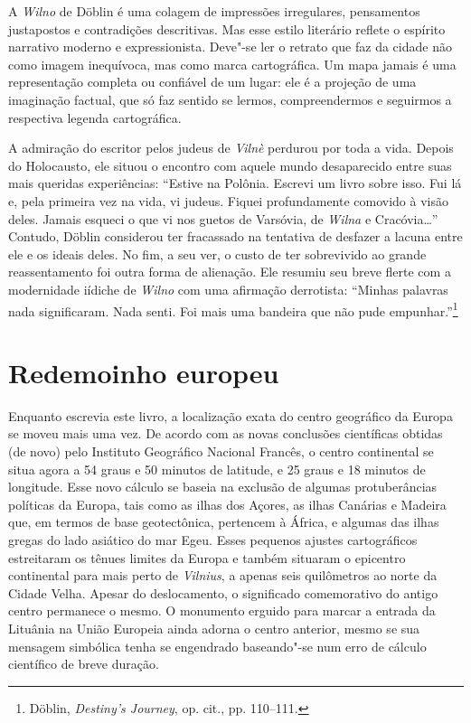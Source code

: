 A \textit{Wilno} de Döblin é uma colagem de impressões irregulares, pensamentos
justapostos e contradições descritivas. Mas esse estilo literário
reflete o espírito narrativo moderno e expressionista. Deve"-se ler o
retrato que faz da cidade não como imagem inequívoca, mas como marca
cartográfica. Um mapa jamais é uma representação completa ou confiável
de um lugar: ele é a projeção de uma imaginação factual, que só faz
sentido se lermos, compreendermos e seguirmos a respectiva legenda
cartográfica.

A admiração do escritor pelos judeus de \textit{Vilnè} perdurou por toda a vida.
Depois do Holocausto, ele situou o encontro com aquele mundo
desaparecido entre suas mais queridas experiências: ``Estive na Polônia.
Escrevi um livro sobre isso. Fui lá e, pela primeira vez na vida, vi
judeus. Fiquei profundamente comovido à visão deles. Jamais esqueci o
que vi nos guetos de Varsóvia, de \textit{Wilna} e Cracóvia\ldots{}'' Contudo,
Döblin considerou ter fracassado na tentativa de desfazer a lacuna entre
ele e os ideais deles. No fim, a seu ver, o custo de ter sobrevivido ao
grande reassentamento foi outra forma de alienação. Ele resumiu seu
breve flerte com a modernidade iídiche de \textit{Wilno} com uma afirmação
derrotista: ``Minhas palavras nada significaram. Nada senti. Foi mais
uma bandeira que não pude empunhar.''\footnote{Döblin, \textit{Destiny's Journey}, op. cit., pp. 110--111.}

\chapter[Redemoinho europeu \medskip]{Redemoinho europeu}

\begin{epigraphs} 
\end{epigraphs}

Enquanto escrevia este livro, a localização exata do centro geográfico
da Europa se moveu mais uma vez. De acordo com as novas conclusões
científicas obtidas (de novo) pelo Instituto Geográfico Nacional
Francês, o centro continental se situa agora a 54 graus e 50 minutos de
latitude, e 25 graus e 18 minutos de longitude. Esse novo cálculo se
baseia na exclusão de algumas protuberâncias políticas da Europa, tais
como as ilhas dos Açores, as ilhas Canárias e Madeira que, em termos de
base geotectônica, pertencem à África, e algumas das ilhas gregas do
lado asiático do mar Egeu. Esses pequenos ajustes cartográficos
estreitaram os tênues limites da Europa e também situaram o epicentro
continental para mais perto de \textit{Vilnius}, a apenas seis quilômetros ao
norte da Cidade Velha. Apesar do deslocamento, o significado
comemorativo do antigo centro permanece o mesmo. O monumento erguido
para marcar a entrada da Lituânia na União Europeia ainda adorna o
centro anterior, mesmo se sua mensagem simbólica tenha se engendrado
baseando"-se num erro de cálculo científico de breve duração.

